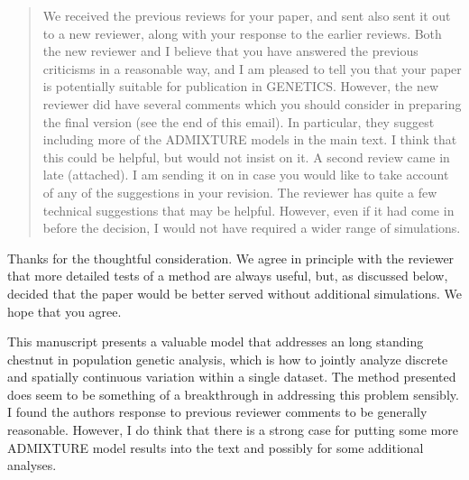 
\begin{quote}
    We received the previous reviews for your paper, and sent also sent it out
    to a new reviewer, along with your response to the earlier reviews. Both the
    new reviewer and I believe that you have answered the previous criticisms in a
    reasonable way, and I am pleased to tell you that your paper is potentially
    suitable for publication in GENETICS. However, the new reviewer did have
    several comments which you should consider in preparing the final version (see
    the end of this email). In particular, they suggest including more of the
    ADMIXTURE models in the main text. I think that this could be helpful, but
    would not insist on it.  A second review came in late (attached).  I am sending
    it on in case you would like to take account of any of the suggestions in your
    revision. The reviewer has quite a few technical suggestions that may be
    helpful.  However, even if it had come in before the decision, I would not have
    required a wider range of simulations.  
\end{quote}

Thanks for the thoughtful consideration.
We agree in principle with the reviewer that more detailed tests of a method are always useful,
but, as discussed below, decided that the paper would be better served without additional simulations.
We hope that you agree.


\begin{point}{}
    This manuscript presents a valuable model that addresses an long standing chestnut in population genetic analysis, which is how to jointly analyze discrete and spatially continuous variation within a single dataset.  The method presented does seem to be something of a breakthrough in addressing this problem sensibly.  I found the authors response to previous reviewer comments to be generally reasonable. However, I do think that there is a strong case for putting some more ADMIXTURE model results into the text and possibly for some additional analyses.
\end{point}


